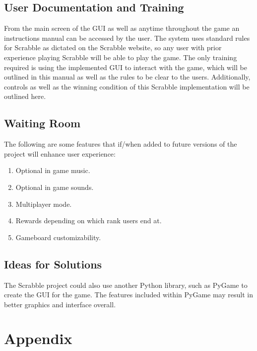 \documentclass[12pt, titlepage]{article}
\begin{document}
\subsection{User Documentation and Training} %

From the main screen of the GUI as well as anytime throughout the game an instructions manual can be accessed by the user. The system uses standard rules for Scrabble as dictated on the Scrabble website, so any user with prior experience playing Scrabble will be able to play the game. The only training required is using the implemented GUI to interact with the game, which will be outlined in this manual as well as the rules to be clear to the users. Additionally, controls as well as the winning condition of this Scrabble implementation will be outlined here.

\subsection{Waiting Room} %

The following are some features that if/when added to future versions of the project will enhance user experience:
\begin{enumerate}
    \item Optional in game music.
    \item Optional in game sounds.
    \item Multiplayer mode.
    \item Rewards depending on which rank users end at.
    \item Gameboard customizability. 
\end{enumerate}

\subsection{Ideas for Solutions} %
The Scrabble project could also use another Python library, such as PyGame to create the GUI for the game. The features included within PyGame may result in better graphics and interface overall.

\newpage





\newpage

\section{Appendix}
\end{document}

